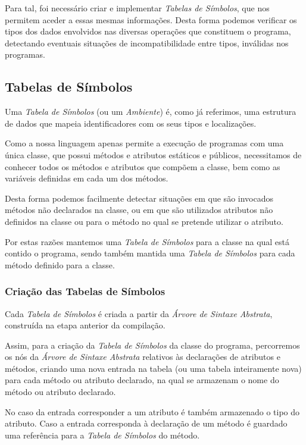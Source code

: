 \documentclass[11pt,a4paper]{article}
\begin{document}
	Para tal, foi necessário criar e implementar \emph{Tabelas de Símbolos}, que nos permitem aceder a essas mesmas informações. Desta forma podemos verificar os tipos dos dados envolvidos nas diversas operações que constituem o programa, detectando eventuais situações de incompatibilidade entre tipos, inválidas nos programas.

	\subsection{Tabelas de Símbolos}
	
	Uma \emph{Tabela de Símbolos} (ou um \emph{Ambiente}) é, como já referimos, uma estrutura de dados que mapeia identificadores com os seus tipos e localizações.
	
	Como a nossa linguagem apenas permite a execução de programas com uma única classe, que possui métodos e atributos estáticos e públicos, necessitamos de conhecer todos os métodos e atributos que compõem a classe, bem como as variáveis definidas em cada um dos métodos.
	
	Desta forma podemos facilmente detectar situações em que são invocados métodos não declarados na classe, ou em que são utilizados atributos não definidos na classe ou para o método no qual se pretende utilizar o atributo. 

	Por estas razões mantemos uma \emph{Tabela de Símbolos} para a classe na qual está contido o programa, sendo também mantida uma \emph{Tabela de Símbolos} para cada método definido para a classe.
	
	\subsubsection{Criação das Tabelas de Símbolos}
	
	Cada \emph{Tabela de Símbolos} é criada a partir da \emph{Árvore de Sintaxe Abstrata}, construída na etapa anterior da compilação.
	
	Assim, para a criação da \emph{Tabela de Símbolos} da classe do programa, percorremos os nós da \emph{Árvore de Sintaxe Abstrata} relativos às declarações de atributos e métodos, criando uma nova entrada na tabela (ou uma tabela inteiramente nova) para cada método ou atributo declarado, na qual se armazenam o nome do método ou atributo declarado.
	
	No caso da entrada corresponder a um atributo é também armazenado o tipo do atributo. Caso a entrada corresponda à declaração de um método é guardado uma referência para a \emph{Tabela de Símbolos} do método.
	
\end{document}
